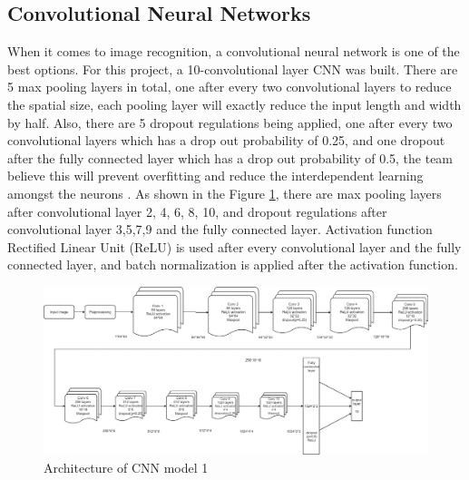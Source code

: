 \documentclass[letterpaper, 10 pt, conference]{ieeeconf}  %
\begin{document}
\subsection{Convolutional Neural Networks}
When it comes to image recognition, a convolutional neural network is one of the best options. For this project, a 10-convolutional layer CNN was built. There are 5 max pooling layers in total, one after every two convolutional layers to reduce the spatial size, each pooling layer will exactly reduce the input length and width by half. Also, there are 5 dropout regulations being applied, one after every two convolutional layers which has a drop out probability of 0.25, and one dropout after the fully connected layer which has a drop out probability of 0.5, the team believe this will prevent overfitting and reduce the interdependent learning amongst the neurons \cite{Budhiraja2016}. As shown in the Figure \ref{fig:CNNarch}, there are max pooling layers after convolutional layer 2, 4, 6, 8, 10, and dropout regulations after convolutional layer 3,5,7,9 and the fully connected layer. Activation function Rectified Linear Unit (ReLU) is used after every convolutional layer and the fully connected layer, and batch normalization is applied after the activation function.
\begin{figure}[t]
	\begin{center}
		\includegraphics[width=1\textwidth]{figures/CNNflowchart.png}  %
		\caption{Architecture of CNN model 1}
		\label{fig:CNNarch}
	\end{center}
\end{figure}
\end{document}
